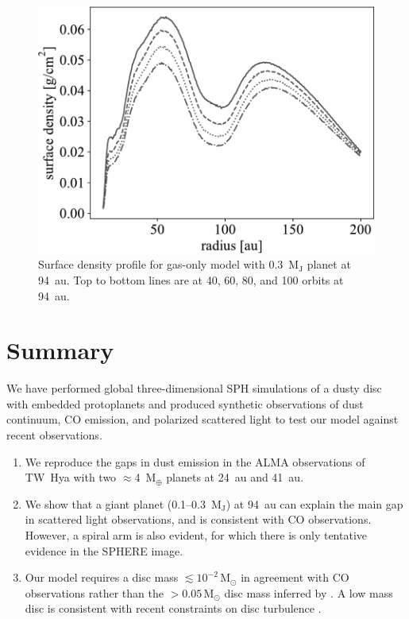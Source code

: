 \documentclass[usenatbib,a4paper,times]{mnras}
\renewcommand{\sun}{\mathrm{M}_{\odot}}
\renewcommand{\earth}{\mathrm{M}_{\oplus}}
\begin{document}
\begin{figure}
   \begin{center}
      \includegraphics[width=1.00\columnwidth]{figs/gap.pdf}
      \caption{Surface density profile for gas-only model with
         0.3~$\mathrm{M_J}$ planet at 94~au. Top to bottom lines are at 40, 60,
         80, and 100 orbits at 94~au.\label{fig:gap}}
   \end{center}
\end{figure}









\section{Summary}
\label{sec:summary}

We have performed global three-dimensional SPH simulations of a dusty disc with
embedded protoplanets and produced synthetic observations of dust continuum, CO
emission, and polarized scattered light to test our model against recent
observations.

\begin{enumerate}
   \item We reproduce the gaps in dust emission in the ALMA observations of
      TW~Hya with two $\approx$4~$\earth{}$ planets at 24~au and 41~au.
   \item We show that a giant planet (0.1--0.3~$\mathrm{M_J}$) at 94~au can
      explain the main gap in scattered light observations, and is consistent
      with CO observations. However, a spiral arm is also evident, for which
      there is only tentative evidence in the SPHERE image.
   \item Our model requires a disc mass $\lesssim10^{-2}\,\sun{}$ in agreement
      with CO observations rather than the $>0.05\,\sun{}$ disc mass inferred by
      \citet{bergin:2013}. A low mass disc is consistent with recent constraints
      on disc turbulence \citep{flaherty:2018}.
\end{enumerate}
\end{document}
